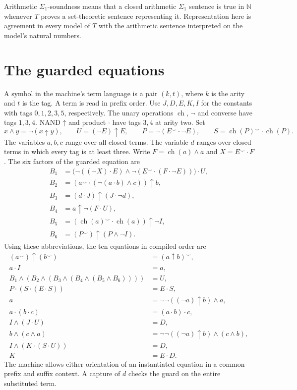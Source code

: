 \documentclass[11pt,letterpaper]{article}
\newcommand{\nand}{\mathbin{\uparrow}}
\newcommand{\conv}[1]{#1^{\smile}}
\newcommand{\ch}{\operatorname{ch}}
\begin{document}
Arithmetic $\Sigma_1$-soundness means that a closed arithmetic
$\Sigma_1$ sentence is true in $\mathbb N$ whenever $T$ proves a
set-theoretic sentence representing it. Representation here is
agreement in every model of $T$ with the arithmetic sentence
interpreted on the model's natural numbers.

\section{The guarded equations}

A symbol in the machine's term language is a pair $(k,t)$, where $k$
is the arity and $t$ is the tag. A term is read in prefix order. Use
$J,D,E,K,I$ for the constants with tags $0,1,2,3,5$, respectively.
The unary operations $\ch$, $\neg$ and converse have tags $1,3,4$.
NAND $\nand$ and product $\cdot$ have tags $3,4$ at arity two. Set
\[
x\wedge y=\neg(x\nand y),\qquad
U=(\neg E)\nand E,\qquad
P=\neg(\conv E\cdot\neg E),\qquad S=\conv{\ch(P)}\cdot\ch(P).
\]
The variables $a,b,c$ range over all closed terms. The variable $d$
ranges over closed terms in which every tag is at least three.
Write $F=\ch(a)\wedge a$ and $X=\conv E\cdot F$. The six factors of
the guarded equation are
\begin{align*}
B_1 &= \bigl(\neg((\neg X)\cdot E) \wedge
                 \neg(\conv E\cdot(F\cdot\neg E))\bigr)\cdot U,\\
B_2 &= (\conv a\cdot(\neg(a\cdot b)\wedge c))\nand b,\\
B_3 &= (d\cdot J)\nand(J\cdot\neg d),\\
B_4 &= a\nand\neg(F\cdot U),\\
B_5 &= (\conv{\ch(a)}\cdot\ch(a))\nand\neg I,\\
B_6 &= (\conv P)\nand(P\wedge\neg I).
\end{align*}
Using these abbreviations, the ten equations in compiled order are
\begin{align*}
(\conv a)\nand(\conv b)&=\conv{(a\nand b)},\\
a\cdot I&=a,\\
B_1\wedge(B_2\wedge(B_3\wedge(B_4\wedge(B_5\wedge B_6))))&=U,\\
P\cdot(S\cdot(E\cdot S))&=E\cdot S,\\
a&=\neg\neg((\neg a)\nand b)\wedge a,\\
a\cdot(b\cdot c)&=(a\cdot b)\cdot c,\\
I\wedge(J\cdot U)&=D,\\
b\wedge(c\wedge a)&=\neg\neg((\neg a)\nand b)\wedge(c\wedge b),\\
I\wedge(K\cdot(S\cdot U))&=D,\\
K&=E\cdot D.
\end{align*}
The machine allows either orientation of an instantiated equation in
a common prefix and suffix context. A capture of $d$ checks the guard
on the entire substituted term.
\end{document}
